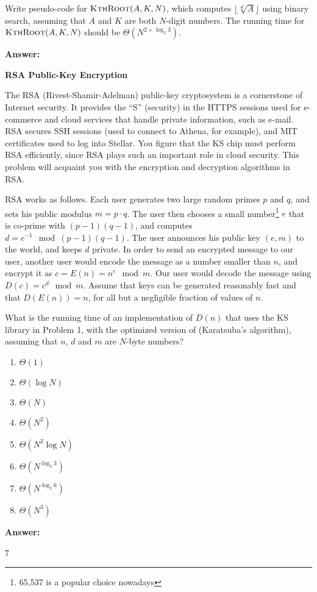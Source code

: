 \documentclass[12pt,twoside]{article}
\newcommand{\answer}{
 \par\medskip
 \textbf{Answer:}
}
\newcommand{\answerIp}{ \answer
}
\newcommand{\answerIIa}{ \answer
7
}
\begin{document}
\begin{problems}
\begin{problemparts}
\problempart {} Write pseudo-code for $\textnormal{\scshape KthRoot}(A, K, N)$, which
computes $\lfloor \sqrt[K]{A} \rfloor$ using binary search, assuming that $A$
and $K$ are both $N$-digit numbers. The running time for $\textnormal{\scshape KthRoot}(A, K,
N)$ should be $\Theta(N^{2 + \log_2 3})$.

\answerIp

\end{problemparts}

\newpage

\problem {} \textbf{RSA Public-Key Encryption}

The RSA (Rivest-Shamir-Adelman) public-key cryptosystem is a cornerstone of
Internet security. It provides the ``S'' (security) in the HTTPS sessions used
for e-commerce and cloud services that handle private information, such as
e-mail. RSA secures SSH sessions (used to connect to Athena, for example), and
MIT certificates used to log into Stellar. You figure that the KS chip must
perform RSA efficiently, since RSA plays such an important role in cloud
security. This problem will acquaint you with the encryption and decryption
algorithms in RSA.

RSA works as follows. Each user generates two large random primes $p$ and $q$,
and sets his public modulus $m = p \cdot q$. The user then chooses a small
number\footnote{65,537 is a popular choice nowadays} $e$ that is co-prime with
$(p - 1)(q - 1)$, and computes $d = e^{-1} \mod (p - 1)(q - 1)$. The user
announces his public key $(e, m)$ to the world, and keeps $d$ private. In order
to send an encrypted message to our user, another user would encode the message
as a number smaller than $n$, and encrypt it as $c = E(n) = n^e \mod m$. Our
user would decode the message using $D(c) = c^d \mod m$. Assume that keys can be
generated reasonably fast and that $D(E(n)) = n$, for all but a negligible
fraction of values of $n$.

\begin{problemparts}
\problempart {} What is the running time of an implementation of $D(n)$
that uses the KS library in Problem 1, with the optimized version of
 (Karatsuba's algorithm), assuming that $n$, $d$ and $m$ are
$N$-byte numbers?
\begin{enumerate}
  \item $\Theta(1)$
  \item $\Theta(\log N)$
  \item $\Theta(N)$
  \item $\Theta(N^2)$
  \item $\Theta(N^2 \log N)$
  \item $\Theta(N^{\log_2 3})$
  \item $\Theta(N^{\log_2 6})$
  \item $\Theta(N^3)$
\end{enumerate}
\answerIIa


\end{problemparts}
\end{problems}
\end{document}
